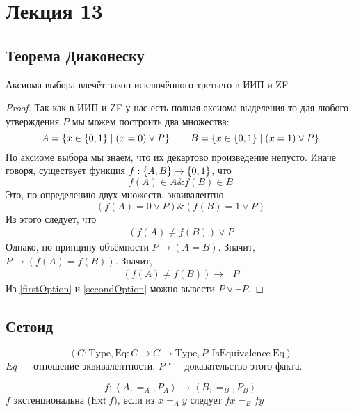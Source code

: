 \section{Лекция 13}

\subsection{Теорема Диаконеску}
\begin{theorem}[Диаконеску]
    Аксиома выбора влечёт закон исключённого третьего в ИИП и ZF
\end{theorem}

\begin{proof}

Так как в ИИП и ZF у нас есть полная аксиома выделения то для любого утверждения $P$ мы можем построить два множества:
\[
    A = \left\{x \in \left\{0, 1\right\} \mid \left(x = 0\right) \lor P\right\} \qquad
    B = \left\{x \in \left\{0, 1\right\} \mid \left(x = 1\right) \lor P\right\}
\]
По аксиоме выбора мы знаем, что их декартово произведение непусто.
Иначе говоря, существует функция $f : \left\{A, B\right\} \to \left\{0, 1\right\}$, что
\[
    f(A) \in A \& f(B) \in B
\]
Это, по определению двух множеств, эквивалентно
\[
    \left(f(A) = 0 \vee P\right) \& \left(f(B) = 1 \vee P\right)
\]
Из этого следует, что
\begin{gather}
    \left(f(A) \neq f(B)\right) \vee P \label{firstOption} \tag{$*$}
\end{gather}
Однако, по принципу объёмности $P \to \left(A=B\right)$. Значит, $P \to \left(f(A) = f(B)\right)$. Значит,
\begin{gather}
    \left(f(A) \neq f(B)\right) \to \neg P \label{secondOption} \tag{$**$}
\end{gather}
Из \ref{firstOption} и \ref{secondOption} можно вывести $P \vee \neg P$.

\end{proof}

\subsection{Сетоид}
\begin{definition}[Сетоид]
    \[
        \left<C : \mathrm{Type}, \mathrm{Eq} : C \to C \to \mathrm{Type}, P : \mathrm{IsEquivalence}~\mathrm{Eq}\right>
    \]
    $Eq$ --- отношение эквивалентности, $P$ "--- доказательство этого факта.
\end{definition}
\begin{definition}[Экстенциональность]
    \[
        f : \left< A, =_A, P_A\right> \to \left<B, =_B, P_B\right>
    \]
    $f$ экстенциональна ($\mathrm{Ext}~f$), если из $x =_A y$ следует $f x =_B f y$
\end{definition}

